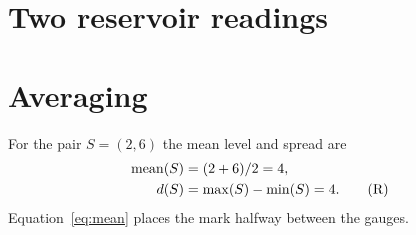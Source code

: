 \documentclass{article}
\begin{document}
\section*{Two reservoir readings}

\section{Averaging}For the pair $S=(2,6)$ the mean level and spread are
\begin{align}
 \operatorname{mean}(S)&=(2+6)/2=4,\label{eq:mean}\\
 d(S)&=\max(S)-\min(S)=4.\tag{R}
\end{align}
Equation~\eqref{eq:mean} places the mark halfway between the gauges.
\end{document}
